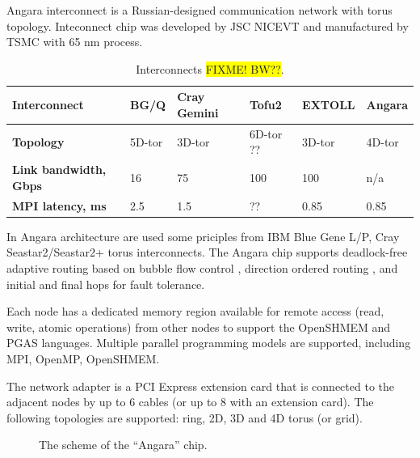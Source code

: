 \documentclass{llncs}
\begin{document}
Angara interconnect is a Russian-designed communication network with torus topology. Inteconnect chip was developed by JSC NICEVT and manufactured by TSMC with 65 nm process. 

\begin{table}[h]
\caption{\label{tab:interconnect}Interconnects \colorbox{yellow}{FIXME! BW??}.}
\begin{center}
\renewcommand{\arraystretch}{1}
\begin{tabular}{|p{33mm}|p{20mm}|p{20mm}|p{20mm}|p{20mm}|p{20mm}|}
\hline
\textbf{Interconnect}           & BG/Q   & Cray Gemini & Tofu2    & EXTOLL & Angara \\
\hline
\textbf{Topology} 				& 5D-tor & 3D-tor      & 6D-tor ??& 3D-tor & 4D-tor\\
\hline
\textbf{Link bandwidth, Gbps}   & 16     & 75          & 100     & 100    & n/a\\
\hline
\textbf{MPI latency, ms}        & 2.5    & 1.5         & ??		 & 0.85	  & 0.85\\
\hline
\end{tabular}
\end{center}
\end{table}

In Angara architecture are used some priciples from IBM Blue Gene L/P, Cray Seastar2/Seastar2+ torus interconnects. 
The Angara chip supports deadlock-free adaptive routing based on bubble flow control \cite{Puente:1999:ABR:850940.852882},  direction ordered routing \cite{Adiga:2005:BGT:1665957.1665963}, \cite{Scott96thecray} and initial and final hops \cite{Scott96thecray} for fault tolerance.

Each node has a dedicated memory region available for remote access (read, write, atomic operations) from other nodes to support the OpenSHMEM and PGAS languages. Multiple parallel programming models are supported, including MPI, OpenMP, OpenSHMEM.

The network adapter is a PCI Express extension card that is connected to the adjacent nodes by up to 6 cables (or up to 8 with an extension card). The following topologies are supported: ring, 2D, 3D and 4D torus (or grid). 


\begin{figure}
\centering
\caption{The scheme of the ``Angara'' chip.}
\end{figure}


\end{document}
